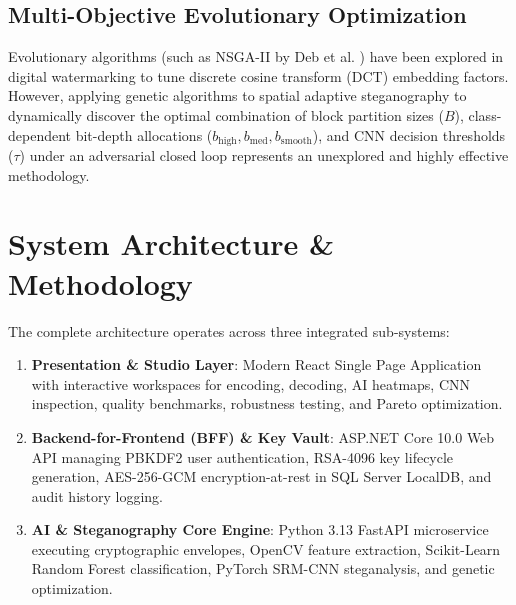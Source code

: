 \documentclass[conference]{IEEEtran}
\begin{document}
\subsection{Multi-Objective Evolutionary Optimization}
Evolutionary algorithms (such as NSGA-II by Deb et al. \cite{deb2002fast}) have been explored in digital watermarking to tune discrete cosine transform (DCT) embedding factors. However, applying genetic algorithms to spatial adaptive steganography to dynamically discover the optimal combination of block partition sizes ($B$), class-dependent bit-depth allocations ($b_{\text{high}}, b_{\text{med}}, b_{\text{smooth}}$), and CNN decision thresholds ($\tau$) under an adversarial closed loop represents an unexplored and highly effective methodology.

\section{System Architecture \& Methodology}
The complete architecture operates across three integrated sub-systems:
\begin{enumerate}
    \item \textbf{Presentation \& Studio Layer}: Modern React Single Page Application with interactive workspaces for encoding, decoding, AI heatmaps, CNN inspection, quality benchmarks, robustness testing, and Pareto optimization.
    \item \textbf{Backend-for-Frontend (BFF) \& Key Vault}: ASP.NET Core 10.0 Web API managing PBKDF2 user authentication, RSA-4096 key lifecycle generation, AES-256-GCM encryption-at-rest in SQL Server LocalDB, and audit history logging.
    \item \textbf{AI \& Steganography Core Engine}: Python 3.13 FastAPI microservice executing cryptographic envelopes, OpenCV feature extraction, Scikit-Learn Random Forest classification, PyTorch SRM-CNN steganalysis, and genetic optimization.
\end{enumerate}
\end{document}
